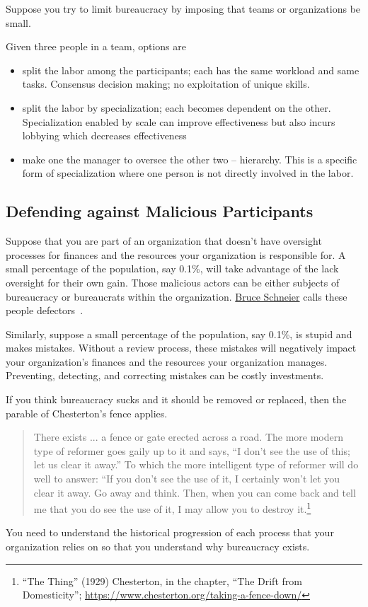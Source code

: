Suppose you try to limit bureaucracy by imposing that teams or organizations be small.

Given three people in a team, options are
\begin{itemize}
    \item split the labor among the participants; each has the same workload and same tasks. Consensus decision making; no exploitation of unique skills.
    \item split the labor by specialization; each becomes dependent on the other. Specialization enabled by scale can improve effectiveness but also incurs lobbying which decreases effectiveness 
    \item make one the manager to oversee the other two -- hierarchy. This is a specific form of specialization where one person is not directly involved in the labor.
\end{itemize}


\subsection*{Defending against Malicious Participants}

Suppose that you are part of an organization that doesn't have oversight processes for finances and the resources your organization is responsible for. A small percentage of the population, say 0.1\%, will take advantage of the lack oversight for their own gain. Those malicious actors can be either subjects of bureaucracy or bureaucrats within the organization. \href{https://en.wikipedia.org/wiki/Bruce_Schneier}{Bruce Schneier} calls these people defectors~\cite{2012_Schneier}.

Similarly, suppose a small percentage of the population, say 0.1\%, is stupid and makes mistakes. Without a review process, these mistakes will negatively impact your organization's finances and the resources your organization manages. Preventing, detecting, and correcting mistakes can be costly investments. 

If you think bureaucracy sucks and it should be removed or replaced, then the parable of Chesterton's fence applies. 
\begin{quote}
There exists ... a fence or gate erected across a road. The more modern type of reformer goes gaily up to it and says, “I don’t see the use of this; let us clear it away.” To which the more intelligent type of reformer will do well to answer: “If you don’t see the use of it, I certainly won’t let you clear it away. Go away and think. Then, when you can come back and tell me that you do see the use of it, I may allow you to destroy it.\footnote{``The Thing'' (1929) Chesterton, in the chapter, ``The Drift from Domesticity''; \href{https://www.chesterton.org/taking-a-fence-down/}{https://www.chesterton.org/taking-a-fence-down/}}
\end{quote}
You need to understand the historical progression of each process that your organization relies on so that you understand why bureaucracy exists.


